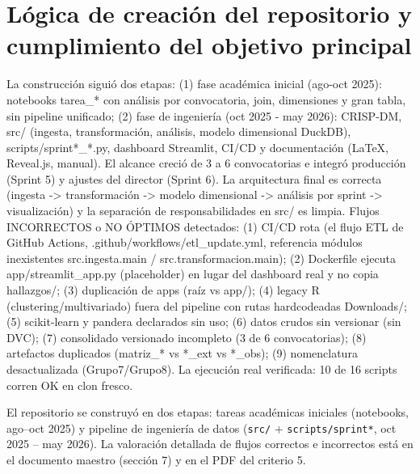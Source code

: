 \section{Lógica de creación del repositorio y cumplimiento del objetivo principal}

La construcción siguió dos etapas: (1) fase académica inicial (ago-oct 2025): notebooks tarea\_* con análisis por convocatoria, join, dimensiones y gran tabla, sin pipeline unificado; (2) fase de ingeniería (oct 2025 - may 2026): CRISP-DM, src/ (ingesta, transformación, análisis, modelo dimensional DuckDB), scripts/sprint*\_*.py, dashboard Streamlit, CI/CD y documentación (LaTeX, Reveal.js, manual). El alcance creció de 3 a 6 convocatorias e integró producción (Sprint 5) y ajustes del director (Sprint 6). La arquitectura final es correcta (ingesta -> transformación -> modelo dimensional -> análisis por sprint -> visualización) y la separación de responsabilidades en src/ es limpia. Flujos INCORRECTOS o NO ÓPTIMOS detectados: (1) CI/CD rota (el flujo ETL de GitHub Actions, .github/workflows/etl\_update.yml, referencia módulos inexistentes src.ingesta.main / src.transformacion.main); (2) Dockerfile ejecuta app/streamlit\_app.py (placeholder) en lugar del dashboard real y no copia hallazgos/; (3) duplicación de apps (raíz vs app/); (4) legacy R (clustering/multivariado) fuera del pipeline con rutas hardcodeadas Downloads/; (5) scikit-learn y pandera declarados sin uso; (6) datos crudos sin versionar (sin DVC); (7) consolidado versionado incompleto (3 de 6 convocatorias); (8) artefactos duplicados (matriz\_* vs *\_ext vs *\_obs); (9) nomenclatura desactualizada (Grupo7/Grupo8). La ejecución real verificada: 10 de 16 scripts corren OK en clon fresco.


\begin{tcolorbox}[hallazgo]
El repositorio se construyó en dos etapas: tareas académicas iniciales
(notebooks, ago--oct 2025) y pipeline de ingeniería de datos (\texttt{src/} +
\texttt{scripts/sprint*}, oct 2025 -- may 2026). La valoración detallada de
flujos correctos e incorrectos está en el documento maestro (sección 7) y en
el PDF del criterio 5.
\end{tcolorbox}
